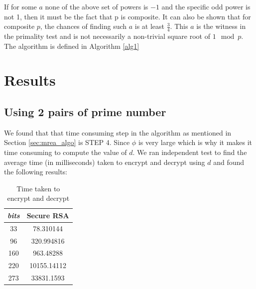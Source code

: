\documentclass[12pt,journal,compsoc]{IEEEtran}
\begin{document}
If for some $a$ none of the above set of powers is $-1$ and the specific odd power is not 1, then it must be the fact that p is composite. It can also be shown that for composite $p$, the chances of finding such $a$ is at least $\frac{3}{4}$. This $a$ is the witness in the primality test and is not necessarily a non-trivial square root of $1 \mod p$. The algorithm is defined in Algorithm \ref{alg1}


%	
 
\section{{Results}}

\subsection{Using 2 pairs of prime number}
We found that that time consuming step in the algorithm as mentioned in Section \ref{sec:mrea_algo} is STEP 4. Since $\phi$ is very large which is why it makes it time consuming to compute the value of $d$. We ran independent test to find the average time (in milliseconds) taken to encrypt and decrypt using $d$ and found the following results:

\begin{table}[ht]
	\begin{center}
	\begin{tabular}{|c|c|}
    	\hline
       		\emph{bits}	&		Secure RSA\\
	\hline
    		33			&	78.310144\\
		96			&	320.994816\\
		160			&	963.48288\\
		220			&	10155.14112\\
		273			&	33831.1593\\
	\hline
	\end{tabular}
	\end{center}
	\caption{Time taken to encrypt and decrypt}
	\label{table:rsa_with_d}

\end{table}
\end{document}
